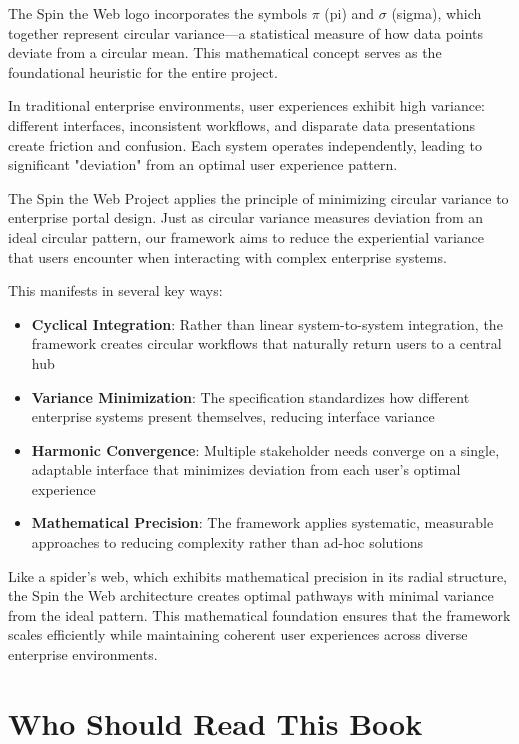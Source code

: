 The Spin the Web logo incorporates the symbols $\pi$ (pi) and $\sigma$ (sigma), which together represent circular variance—a statistical measure of how data points deviate from a circular mean. This mathematical concept serves as the foundational heuristic for the entire project.

In traditional enterprise environments, user experiences exhibit high variance: different interfaces, inconsistent workflows, and disparate data presentations create friction and confusion. Each system operates independently, leading to significant "deviation" from an optimal user experience pattern.

The Spin the Web Project applies the principle of minimizing circular variance to enterprise portal design. Just as circular variance measures deviation from an ideal circular pattern, our framework aims to reduce the experiential variance that users encounter when interacting with complex enterprise systems.

This manifests in several key ways:
\begin{itemize}
\item \textbf{Cyclical Integration}: Rather than linear system-to-system integration, the framework creates circular workflows that naturally return users to a central hub
\item \textbf{Variance Minimization}: The \wbdl specification standardizes how different enterprise systems present themselves, reducing interface variance
\item \textbf{Harmonic Convergence}: Multiple stakeholder needs converge on a single, adaptable interface that minimizes deviation from each user's optimal experience
\item \textbf{Mathematical Precision}: The framework applies systematic, measurable approaches to reducing complexity rather than ad-hoc solutions
\end{itemize}

Like a spider's web, which exhibits mathematical precision in its radial structure, the Spin the Web architecture creates optimal pathways with minimal variance from the ideal pattern. This mathematical foundation ensures that the framework scales efficiently while maintaining coherent user experiences across diverse enterprise environments.

\section*{Who Should Read This Book}

